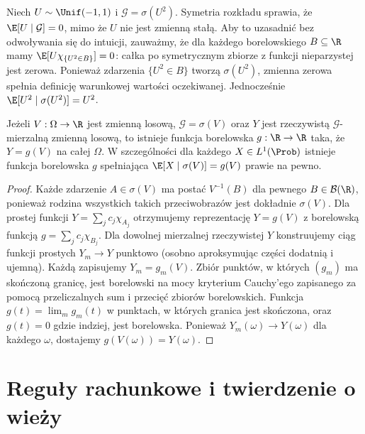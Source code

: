 \begin{przyklad}
Niech $U\sim\Unif(-1,1)$ i
$\mathcal G=\sigma(U^2)$. Symetria rozkładu sprawia,
że $\E[U\mid\mathcal G]=0$, mimo że $U$ nie jest
zmienną stałą. Aby to uzasadnić bez odwoływania się
do intuicji, zauważmy, że dla każdego borelowskiego
$B\subseteq\R$ mamy
$\E[U\chi_{\{U^2\in B\}}]=0$:
całka po symetrycznym zbiorze z funkcji nieparzystej
jest zerowa. Ponieważ zdarzenia $\{U^2\in B\}$
tworzą $\sigma(U^2)$, zmienna zerowa spełnia
definicję warunkowej wartości oczekiwanej.
Jednocześnie $\E[U^2\mid\sigma(U^2)]=U^2$.
\end{przyklad}

\begin{twierdzenie}
Jeżeli $V:\Omega\to\R$ jest zmienną losową,
$\mathcal G=\sigma(V)$ oraz $Y$ jest rzeczywistą
$\mathcal G$-mierzalną zmienną losową, to istnieje
funkcja borelowska $g:\R\to\R$ taka, że
$Y=g(V)$ na całej $\Omega$. W szczególności
dla każdego $X\in L^1(\Prob)$ istnieje funkcja
borelowska $g$ spełniająca
$\E[X\mid\sigma(V)]=g(V)$ prawie na pewno.
\end{twierdzenie}
\begin{proof}
Każde zdarzenie $A\in\sigma(V)$ ma postać
$V^{-1}(B)$ dla pewnego $B\in\mathcal B(\R)$,
ponieważ rodzina wszystkich takich przeciwobrazów
jest dokładnie $\sigma(V)$. Dla prostej funkcji
$Y=\sum_j c_j\chi_{A_j}$ otrzymujemy reprezentację
$Y=g(V)$ z borelowską funkcją
$g=\sum_j c_j\chi_{B_j}$.
Dla dowolnej mierzalnej rzeczywistej $Y$
konstruujemy ciąg funkcji prostych $Y_m\to Y$
punktowo (osobno aproksymując części dodatnią
i ujemną). Każdą zapisujemy $Y_m=g_m(V)$.
Zbiór punktów, w których $(g_m)$ ma skończoną granicę,
jest borelowski na mocy kryterium Cauchy'ego zapisanego
za pomocą przeliczalnych sum i przecięć zbiorów borelowskich.
Funkcja $g(t)=\lim_m g_m(t)$ w punktach, w których
granica jest skończona, oraz $g(t)=0$ gdzie indziej,
jest borelowska. Ponieważ $Y_m(\omega)\to Y(\omega)$
dla każdego $\omega$, dostajemy $g(V(\omega))=Y(\omega)$.
\end{proof}

\section{Reguły rachunkowe i twierdzenie o wieży}

